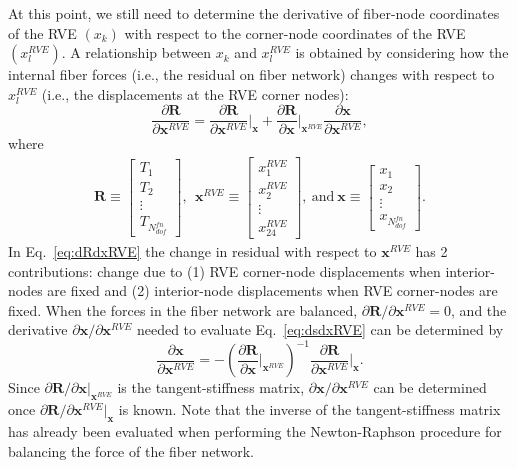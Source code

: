 At this point, we still need to determine the derivative of fiber-node coordinates of the RVE $(x_k)$ with respect to the corner-node coordinates of the RVE $(x_l^{RVE})$. A relationship between $x_k$ and $x_l^{RVE}$ is obtained by considering how the internal fiber forces (i.e., the residual on fiber network) changes with respect to $x_l^{RVE}$ (i.e., the displacements at the RVE corner nodes):
%
\begin{equation}
\frac{\partial \pmb{R}}{\partial \pmb{x}^{RVE}} = \frac{\partial \pmb{R}}{\partial \pmb{x}^{RVE}} \bigg |_{\pmb{x}} + \frac{\partial \pmb{R}}{\partial \pmb{x}} \bigg |_{\pmb{x}^{RVE}} \frac{\partial \pmb{x}}{\partial \pmb{x}^{RVE}},
\label{eq:dRdxRVE}
\end{equation}
%
where
%
\begin{eqnarray}
\pmb{R} \equiv \begin{bmatrix}
T_1 \\
T_2 \\
\vdots \\
T_{N_{dof}^{fn}}
\end{bmatrix}, \ \ 
%
\pmb{x}^{RVE} \equiv \begin{bmatrix}
x_1^{RVE} \\
x_2^{RVE} \\
\vdots \\
x_{24}^{RVE}
\end{bmatrix}, \ \text{and} \
%
\pmb{x} \equiv \begin{bmatrix}
x_1 \\
x_2 \\
\vdots \\
x_{N_{dof}^{fn}} 
\end{bmatrix} .
\end{eqnarray}
%
In Eq.\ \eqref{eq:dRdxRVE} the change in residual with respect to $\pmb{x}^{RVE}$ has 2 contributions: change due to (1) RVE corner-node displacements when interior-nodes are fixed and (2) interior-node displacements when RVE corner-nodes  are fixed. When the forces in the fiber network are balanced, $\partial \pmb{R}/\partial \pmb{x}^{RVE} = 0$, and the derivative $\partial \pmb{x}/\partial \pmb{x}^{RVE}$ needed to evaluate Eq.\ \eqref{eq:dsdxRVE} can be determined by
%
\begin{equation}
\frac{\partial \pmb{x}}{\partial \pmb{x}^{RVE}} = -\left(\frac{\partial \pmb{R}}{\partial \pmb{x}} \bigg |_{\pmb{x}^{RVE}}\right)^{-1}\frac{\partial \pmb{R}}{\partial \pmb{x}^{RVE}}\bigg |_{\pmb{x}} .
\end{equation}
%
Since $\partial \pmb{R}/\partial \pmb{x} |_{\pmb{x}^{RVE}}$ is the tangent-stiffness matrix, $\partial \pmb{x}/\partial \pmb{x}^{RVE}$ can be determined once $\partial \pmb{R}/\partial \pmb{x}^{RVE} |_{\pmb{x}}$ is known. Note that the inverse of the tangent-stiffness matrix has already been evaluated when performing the Newton-Raphson procedure for balancing the force of the fiber network.

